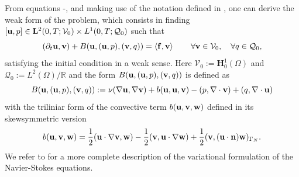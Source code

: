 
From equations -, and making use of the notation defined in , one can derive the weak form of the problem, which consists in finding $[{\bf u},p]\in\mathbf{L}^2(0,T;\mathcal{V}_0)\times L^1(0,T;\mathcal{Q}_0)$ such that
\begin{equation}
\label{eq-C7_NS_weak}
(\partial_t{\bf u},{\bf v})+B({\bf u},({\bf u},p),({\bf v},q)) = \left<{\bf f},{\bf v}\right> 
\quad\quad\forall{\bf v}\in\mathcal{V}_0,\quad\forall q\in\mathcal{Q}_0,
\end{equation}
satisfying the initial condition  in a weak sense. Here $\mathcal{V}_0:=\mathbf{H}_0^1(\Omega)$ and $\mathcal{Q}_0:=L^2(\Omega)/\mathbb{R}$ and the form $B({\bf u},({\bf u},p),({\bf v},q))$ is defined as 
\begin{equation}
\label{eq-C7_bilinear}
B({\bf u},({\bf u},p),({\bf v},q)):=\nu(\nabla{\bf u},\nabla{\bf v})+b({\bf u},{\bf u},{\bf v})-(p,\nabla\cdot{\bf v})+(q,\nabla\cdot{\bf u})
\end{equation}
with the triliniar form of the convective term $b({\bf u},{\bf v},{\bf w})$ defined in its skewsymmetric version
\begin{equation}
\label{eq-C7_conv_skew}
b({\bf u},{\bf v},{\bf w})=\frac{1}{2}({\bf u}\cdot\nabla{\bf v},{\bf w})-\frac{1}{2}({\bf v},{\bf u}\cdot\nabla{\bf w})+\frac{1}{2}({\bf v},({\bf u}\cdot\mathbf{n}){\bf w})_{\Gamma_N}.
\end{equation}
We refer to  for a more complete description of the variational formulation of the Navier-Stokes equations.


